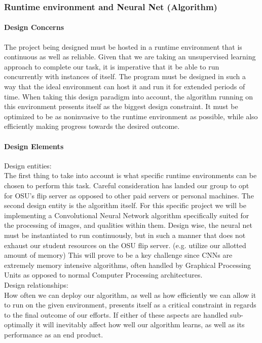 \documentclass[article, onecolumn, draftclsnofoot,10pt, compsoc]{IEEEtran}
\begin{document}
\subsubsection{Runtime environment and Neural Net (Algorithm)}
\paragraph{Design Concerns}
	The project being designed must be hosted in a runtime environment that is continuous as well as reliable. Given that we are taking an unsupervised learning approach to complete our task, it is imperative that it be able to run concurrently with instances of itself. The program must be designed in such a way that the ideal environment can host it and run it for extended periods of time. When taking this design paradigm into account, the algorithm running on this environment presents itself as the biggest design constraint. It must be optimized to be as noninvasive to the runtime environment as possible, while also efficiently making progress towards the desired outcome. 

\paragraph{Design Elements}
Design entities:\\
	The first thing to take into account is what specific runtime environments can be chosen to perform this task. Careful consideration has landed our group to opt for OSU’s flip server as opposed to other paid servers or personal machines. The second design entity is the algorithm itself. For this specific project we will be implementing a Convolutional Neural Network algorithm specifically suited for the processing of images, and qualities within them. Design wise, the neural net must be instantiated to run continuously, but in such a manner that does not exhaust our student resources on the OSU flip server. (e.g. utilize our allotted amount of memory) This will prove to be a key challenge since CNNs are extremely memory intensive algorithms, often handled by Graphical Processing Units as opposed to normal Computer Processing architectures. \\

	Design relationships:\\
	How often we can deploy our algorithm, as well as how efficiently we can allow it to run on the given environment, presents itself as a critical constraint in regards to the final outcome of our efforts. If either of these aspects are handled sub-optimally it will inevitably affect how well our algorithm learns, as well as its performance as an end product. \\
\end{document}
